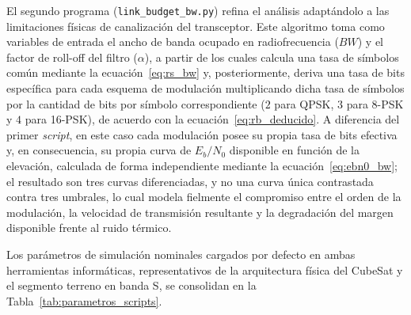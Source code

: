 El segundo programa (\texttt{link\_budget\_bw.py}) refina el análisis adaptándolo a las limitaciones físicas de canalización del transceptor. Este algoritmo toma como variables de entrada el ancho de banda ocupado en radiofrecuencia ($BW$) y el factor de roll-off del filtro ($\alpha$), a partir de los cuales calcula una tasa de símbolos común mediante la ecuación~\eqref{eq:rs_bw} y, posteriormente, deriva una tasa de bits específica para cada esquema de modulación multiplicando dicha tasa de símbolos por la cantidad de bits por símbolo correspondiente ($2$ para QPSK, $3$ para 8-PSK y $4$ para 16-PSK), de acuerdo con la ecuación~\eqref{eq:rb_deducido}. A diferencia del primer \textit{script}, en este caso cada modulación posee su propia tasa de bits efectiva y, en consecuencia, su propia curva de $E_b/N_0$ disponible en función de la elevación, calculada de forma independiente mediante la ecuación~\eqref{eq:ebn0_bw}; el resultado son tres curvas diferenciadas, y no una curva única contrastada contra tres umbrales, lo cual modela fielmente el compromiso entre el orden de la modulación, la velocidad de transmisión resultante y la degradación del margen disponible frente al ruido térmico.

Los parámetros de simulación nominales cargados por defecto en ambas herramientas informáticas, representativos de la arquitectura física del CubeSat y el segmento terreno en banda S, se consolidan en la Tabla~\ref{tab:parametros_scripts}.

